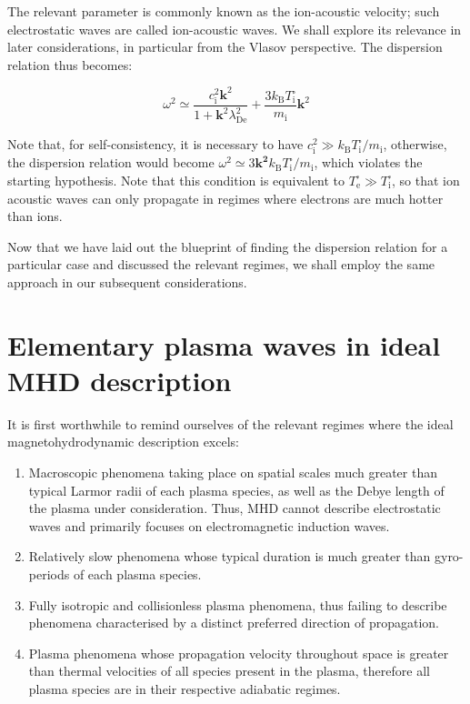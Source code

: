 \begin{enumerate}
    The relevant parameter is commonly known as the ion-acoustic velocity; such electrostatic waves are called ion-acoustic waves. We shall explore its relevance in later considerations, in particular from the Vlasov perspective. The dispersion relation thus becomes:

    \begin{equation}
        \omega^2\simeq\frac{c_\mathrm{i}^2\mathbf{k}^2}{1+\mathbf{k}^2\lambda_\text{De}^2}+\frac{3k_\mathrm{B}T_\mathrm{i}^\square}{m_\mathrm{i}}\mathbf{k}^2
    \end{equation}

    Note that, for self-consistency, it is necessary to have $c_\mathrm{i}^2\gg k_\mathrm{B}T_\mathrm{i}^\square/m_\mathrm{i}$, otherwise, the dispersion relation would become $\omega^2\simeq 3\mathbf{k^2}k_\mathrm{B}T_\mathrm{i}^\square/m_\mathrm{i}$, which violates the starting hypothesis. Note that this condition is equivalent to $T_\text{e}^\square\gg T_\mathrm{i}^\square$, so that ion acoustic waves can only propagate in regimes where electrons are much hotter than ions.
\end{enumerate}

Now that we have laid out the blueprint of finding the dispersion relation for a particular case and discussed the relevant regimes, we shall employ the same approach in our subsequent considerations.

\section{Elementary plasma waves in ideal MHD description}

It is first worthwhile to remind ourselves of the relevant regimes where the ideal magnetohydrodynamic description excels:

\begin{enumerate}
    \item Macroscopic phenomena taking place on spatial scales much greater than typical Larmor radii of each plasma species, as well as the Debye length of the plasma under consideration. Thus, MHD cannot describe electrostatic waves and primarily focuses on electromagnetic induction waves.
    \item Relatively slow phenomena whose typical duration is much greater than gyro-periods of each plasma species.
    \item Fully isotropic and collisionless plasma phenomena, thus failing to describe phenomena characterised by a distinct preferred direction of propagation.
    \item Plasma phenomena whose propagation velocity throughout space is greater than thermal velocities of all species present in the plasma, therefore all plasma species are in their respective adiabatic regimes.
\end{enumerate}

